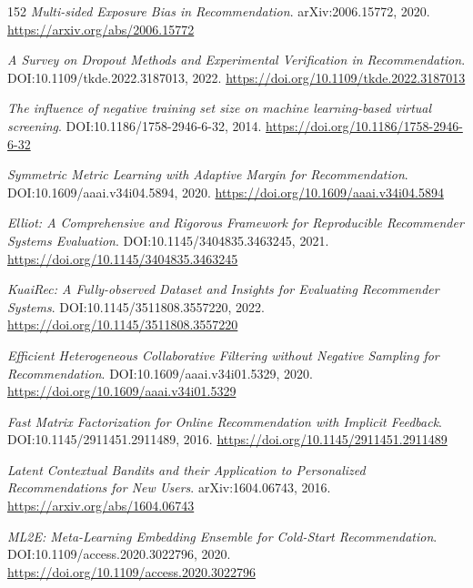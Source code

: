 \documentclass[11pt,a4paper]{article}
\begin{document}
\begin{thebibliography}{152}
\newblock \emph{Multi-sided Exposure Bias in Recommendation}.
\newblock arXiv:2006.15772, 2020.
\newblock \url{https://arxiv.org/abs/2006.15772}

\newblock \emph{A Survey on Dropout Methods and Experimental Verification in Recommendation}.
\newblock DOI:10.1109/tkde.2022.3187013, 2022.
\newblock \url{https://doi.org/10.1109/tkde.2022.3187013}

\newblock \emph{The influence of negative training set size on machine learning-based virtual screening}.
\newblock DOI:10.1186/1758-2946-6-32, 2014.
\newblock \url{https://doi.org/10.1186/1758-2946-6-32}

\newblock \emph{Symmetric Metric Learning with Adaptive Margin for Recommendation}.
\newblock DOI:10.1609/aaai.v34i04.5894, 2020.
\newblock \url{https://doi.org/10.1609/aaai.v34i04.5894}

\newblock \emph{Elliot: A Comprehensive and Rigorous Framework for Reproducible Recommender Systems Evaluation}.
\newblock DOI:10.1145/3404835.3463245, 2021.
\newblock \url{https://doi.org/10.1145/3404835.3463245}

\newblock \emph{KuaiRec: A Fully-observed Dataset and Insights for Evaluating Recommender Systems}.
\newblock DOI:10.1145/3511808.3557220, 2022.
\newblock \url{https://doi.org/10.1145/3511808.3557220}

\newblock \emph{Efficient Heterogeneous Collaborative Filtering without Negative Sampling for Recommendation}.
\newblock DOI:10.1609/aaai.v34i01.5329, 2020.
\newblock \url{https://doi.org/10.1609/aaai.v34i01.5329}

\newblock \emph{Fast Matrix Factorization for Online Recommendation with Implicit Feedback}.
\newblock DOI:10.1145/2911451.2911489, 2016.
\newblock \url{https://doi.org/10.1145/2911451.2911489}

\newblock \emph{Latent Contextual Bandits and their Application to Personalized Recommendations for New Users}.
\newblock arXiv:1604.06743, 2016.
\newblock \url{https://arxiv.org/abs/1604.06743}

\newblock \emph{ML2E: Meta-Learning Embedding Ensemble for Cold-Start Recommendation}.
\newblock DOI:10.1109/access.2020.3022796, 2020.
\newblock \url{https://doi.org/10.1109/access.2020.3022796}


\end{thebibliography}
\end{document}

